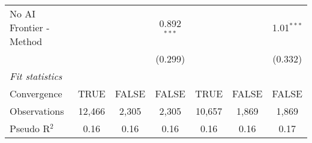 \begin{tabular}{lcccccc}
   No AI Frontier - Method &               &               & 0.892$^{***}$ &               &               & 1.01$^{***}$\\   
                           &               &               & (0.299)       &               &               & (0.332)\\   
   \midrule
   \emph{Fit statistics}\\
   Convergence             &TRUE           & FALSE         & FALSE         & TRUE          & FALSE         & FALSE\\  
   Observations            & 12,466        & 2,305         & 2,305         & 10,657        & 1,869         & 1,869\\  
   Pseudo R$^2$            & 0.16          & 0.16          & 0.16          & 0.16          & 0.16          & 0.17\\  
   

\end{tabular}
